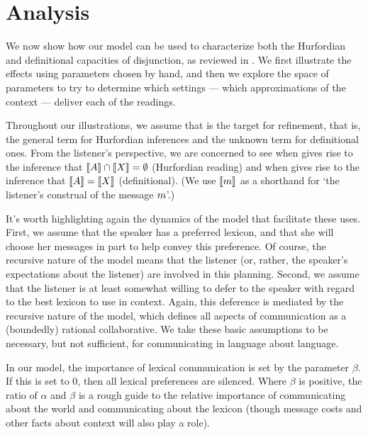 \documentclass{article}
\begin{document}
\section{Analysis}\label{sec:analysis}

We now show how our model can be used to characterize both the
Hurfordian and definitional capacities of disjunction, as reviewed in
. We first illustrate the effects using parameters
chosen by hand, and then we explore the space of parameters to try to
determine which settings --- which approximations of the context ---
deliver each of the readings. 

Throughout our illustrations, we assume that  is the target
for refinement, that is, the general term for Hurfordian inferences
and the unknown term for definitional ones.  From the listener's
perspective, we are concerned to see when  gives rise to
the inference that $\llbracket A\rrbracket \cap \llbracket X\rrbracket = \emptyset$ (Hurfordian
reading) and when  gives rise to the inference that
$\llbracket A\rrbracket = \llbracket X\rrbracket$ (definitional). (We use $\llbracket m\rrbracket$ as a
shorthand for `the listener's construal of the message $m$'.)

It's worth highlighting again the dynamics of the model that
facilitate these uses. First, we assume that the speaker has a
preferred lexicon, and that she will choose her messages in part to
help convey this preference. Of course, the recursive nature of the
model means that the listener (or, rather, the speaker's expectations
about the listener) are involved in this planning. Second, we assume
that the listener is at least somewhat willing to defer to the speaker
with regard to the best lexicon to use in context. Again, this
deference is mediated by the recursive nature of the model, which
defines all aspects of communication as a (boundedly) rational
collaborative. We take these basic assumptions to be necessary, but
not sufficient, for communicating in language about language.

In our model, the importance of lexical communication is set by the
parameter $\beta$. If this is set to $0$, then all lexical preferences
are silenced. Where $\beta$ is positive, the ratio of $\alpha$ and
$\beta$ is a rough guide to the relative importance of communicating
about the world and communicating about the lexicon (though message
costs and other facts about context will also play a role).

\end{document}
